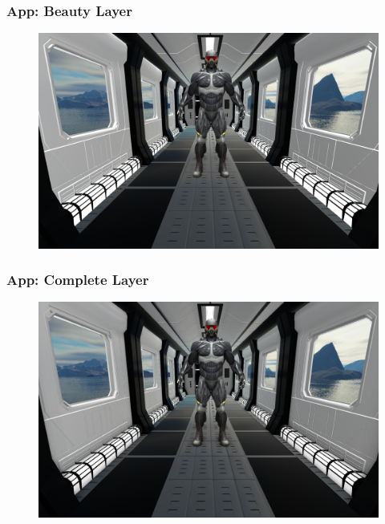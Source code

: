 \documentclass{beamer}
\begin{document}
\begin{frame}
\frametitle{App: Beauty Layer}
\begin{figure}
    \centering
    \includegraphics[width=\resultwidth]{images/app_beauty}
\end{figure}

\end{frame}

\begin{frame}
\frametitle{App: Complete Layer}
\begin{figure}
    \centering
    \includegraphics[width=\resultwidth]{images/app_complete}
\end{figure}

\end{frame}
\end{document}
